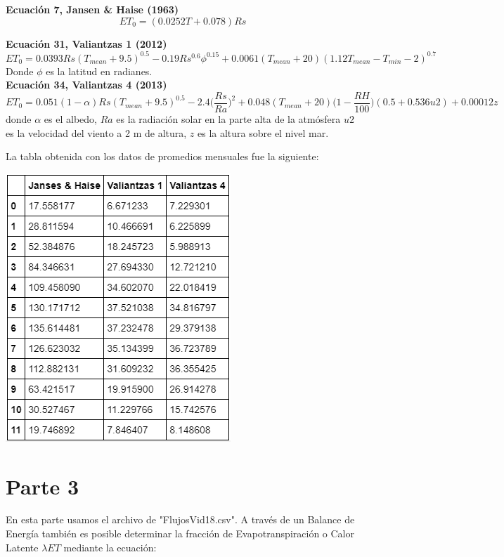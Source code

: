 \documentclass{article}
\begin{document}
\textbf{Ecuación 7, Jansen \& Haise (1963)}
\begin{equation}
    ET_0 = (0.0252 T + 0.078) Rs
\end{equation}

\textbf{Ecuación 31, Valiantzas 1 (2012)}
\begin{equation}
    ET_0 = 0.0393 Rs (T_{mean} + 9.5)^{0.5} - 0.19 Rs ^{0.6} \phi ^{0.15} + 0.0061 (T_{mean} + 20)(1.12 T_{mean} - T_{min}-2)^{0.7}
\end{equation}
Donde $\phi$ es la latitud en radianes.
\\

\textbf{Ecuación 34, Valiantzas 4 (2013)}
\begin{equation}
    ET_0 = 0.051 (1 - \alpha) Rs (T_{mean} + 9.5)^{0.5}-2.4\bigg(\frac{Rs}{Ra}\bigg)^{2} + 0.048 (T_{mean} + 20)\bigg(1-\frac{RH}{100}\bigg)(0.5+0.536 u 2) + 0.00012z
\end{equation}
donde $\alpha$ es el albedo, $Ra$ es la radiación solar en la parte alta de la atmósfera $u2$ es la velocidad del viento a 2 m de altura, $z$ es la altura sobre el nivel mar.
\clearpage

La tabla obtenida con los datos de promedios mensuales fue la siguiente:
\begin{center}
    \includegraphics[scale = 0.7]{Tabla2.png}
\end{center}

\section{Parte 3}
En esta parte usamos el archivo de "FlujosVid18.csv". A través de un Balance de Energía también es posible determinar la fracción de Evapotranspiración o Calor Latente $\lambda ET$ mediante la ecuación:
\end{document}
